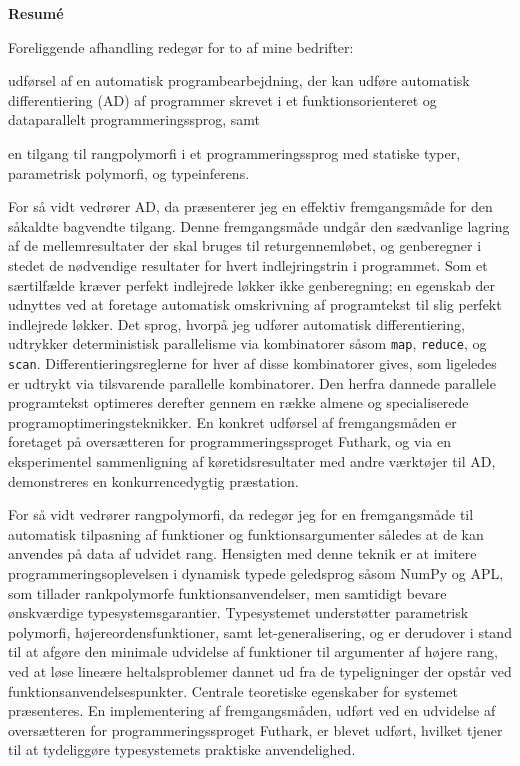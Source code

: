 \newpage
\begin{center}
\textbf{Resum\'e}
\end{center}
Foreliggende afhandling redegør for to af mine bedrifter:
\begin{enumerate*}[label=\arabic*)]
\item udførsel af en automatisk programbearbejdning, der kan udføre
  automatisk differentiering (AD) af programmer skrevet i et
  funktionsorienteret og dataparallelt programmeringssprog, samt
\item en tilgang til rangpolymorfi i et programmeringssprog med
  statiske typer, parametrisk polymorfi, og typeinferens.
\end{enumerate*}

For så vidt vedrører AD, da præsenterer jeg en effektiv fremgangsmåde
for den såkaldte bagvendte tilgang. Denne fremgangsmåde undgår den
sædvanlige lagring af de mellemresultater der skal bruges til
returgennemløbet, og genberegner i stedet de nødvendige resultater for
hvert indlejringstrin i programmet. Som et særtilfælde kræver perfekt
indlejrede løkker ikke genberegning; en egenskab der udnyttes ved at
foretage automatisk omskrivning af programtekst til slig perfekt
indlejrede løkker.
%
Det sprog, hvorpå jeg udfører automatisk differentiering, udtrykker
deterministisk parallelisme via kombinatorer såsom \texttt{map},
\texttt{reduce}, og \texttt{scan}. Differentieringsreglerne for hver
af disse kombinatorer gives, som ligeledes er udtrykt via tilsvarende
parallelle kombinatorer. Den herfra dannede parallele programtekst
optimeres derefter gennem en række almene og specialiserede
programoptimeringsteknikker.
%
En konkret udførsel af fremgangsmåden er foretaget på oversætteren for
programmeringssproget Futhark, og via en eksperimentel sammenligning
af køretidsresultater med andre værktøjer til AD, demonstreres en
konkurrencedygtig præstation.

For så vidt vedrører rangpolymorfi, da redegør jeg for en
fremgangsmåde til automatisk tilpasning af funktioner og
funktionsargumenter således at de kan anvendes på data af udvidet
rang. Hensigten med denne teknik er at imitere
programmeringsoplevelsen i dynamisk typede geledsprog såsom NumPy og
APL, som tillader rankpolymorfe funktionsanvendelser, men samtidigt
bevare ønskværdige typesystemsgarantier. Typesystemet understøtter
parametrisk polymorfi, højereordensfunktioner, samt
let-generalisering, og er derudover i stand til at afgøre den minimale
udvidelse af funktioner til argumenter af højere rang, ved at løse
lineære heltalsproblemer dannet ud fra de typeligninger der opstår ved
funktionsanvendelsespunkter. Centrale teoretiske egenskaber for
systemet præsenteres. En implementering af fremgangsmåden, udført ved
en udvidelse af oversætteren for programmeringssproget Futhark, er
blevet udført, hvilket tjener til at tydeliggøre typesystemets
praktiske anvendelighed.

